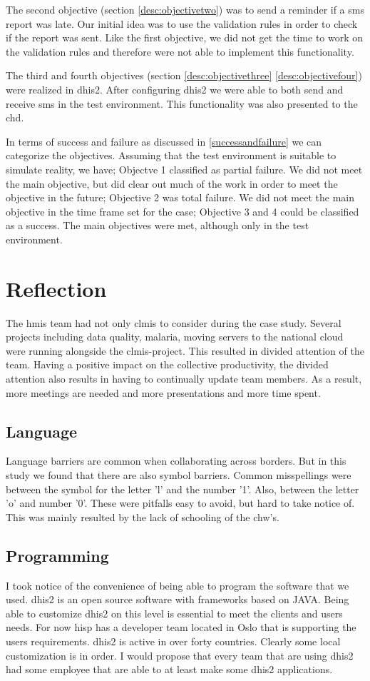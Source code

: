 The second objective (section \ref{desc:objectivetwo}) was to send a reminder if a \gls{sms} report was late. Our initial idea was to use the validation rules in order to check if the report was sent. Like the first objective, we did not get the time to work on the validation rules and therefore were not able to implement this functionality.

The third and fourth objectives (section \ref{desc:objectivethree} \ref{desc:objectivefour}) were realized in \gls{dhis2}. After configuring \gls{dhis2} we were able to both send and receive \gls{sms} in the test environment. This functionality was also presented to the \gls{chd}.

In terms of success and failure as discussed in \ref{successandfailure} we can categorize the objectives. Assuming that the test environment is suitable to simulate reality, we have; Objectve 1 classified as partial failure. We did not meet the main objective, but did clear out much of the work in order to meet the objective in the future; Objective 2 was total failure. We did not meet the main objective in the time frame set for the case; Objective 3 and 4 could be classified as a success. The main objectives were met, although only in the test environment. 

\section{Reflection}
The \gls{hmis} team had not only \gls{clmis} to consider during the case study.
Several projects including data quality, malaria, moving servers to the national cloud were running alongside the \gls{clmis}-project. This resulted in divided attention of the team.
Having a positive impact on the collective productivity, the divided attention also results in having to continually update team members. As a result, more meetings are needed and more presentations and more time spent. 
\subsection{Language}
Language barriers are common when collaborating across borders. But in this study we found that there are also symbol barriers.
Common misspellings were between the symbol for the letter 'l' and the number '1'.
Also, between the letter 'o' and number '0'. 
These were pitfalls easy to avoid, but hard to take notice of.
This was mainly resulted by the lack of schooling of the \gls{chw}'s. 
\subsection{Programming}
I took notice of the convenience of being able to program the software that we used.
\gls{dhis2} is an open source software with frameworks based on JAVA. 
Being able to customize \gls{dhis2} on this level is essential to meet the clients and users needs.
For now \gls{hisp} has a developer team located in Oslo that is supporting the users requirements.
\gls{dhis2} is active in over forty countries. 
Clearly some local customization is in order. 
I would propose that every team that are using \gls{dhis2} had some employee that are able to at least make some \gls{dhis2} applications.

